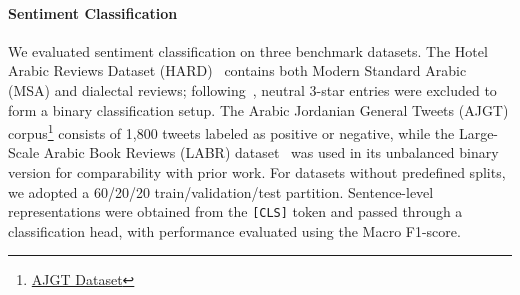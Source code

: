 






\paragraph{Sentiment Classification}
We evaluated sentiment classification on three benchmark datasets. The Hotel Arabic Reviews Dataset (HARD)~\cite{Elnagar2018} contains both Modern Standard Arabic (MSA) and dialectal reviews; following~\cite{antoun2020arabert}, neutral 3-star entries were excluded to form a binary classification setup. The Arabic Jordanian General Tweets (AJGT) corpus\footnote{\href{https://github.com/komari6/Arabic-twitter-corpus-AJGT}{AJGT Dataset}} consists of 1,800 tweets labeled as positive or negative, while the Large-Scale Arabic Book Reviews (LABR) dataset~\cite{aly-atiya-2013-labr} was used in its unbalanced binary version for comparability with prior work. For datasets without predefined splits, we adopted a 60/20/20 train/validation/test partition. Sentence-level representations were obtained from the \texttt{[CLS]} token and passed through a classification head, with performance evaluated using the Macro F1-score.

